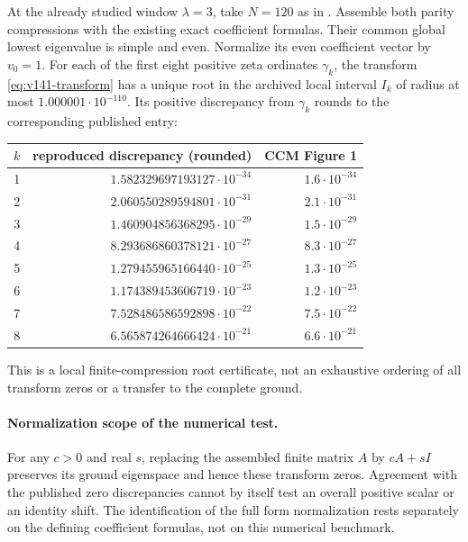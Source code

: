 \begin{proposition}
\label{prop:v141-ccm-lock}
At the already studied window $\lambda=3$, take $N=120$ as in
\cite[Section 6, Figure 1]{ConnesConsaniMoscovici2025}. Assemble
both parity compressions with the existing exact coefficient formulas.
Their common global lowest eigenvalue is simple and even. Normalize
its even coefficient vector by $v_0=1$. For each of the first eight
positive zeta ordinates $\gamma_k$, the transform
\eqref{eq:v141-transform} has a unique root in the archived local
interval $I_k$ of radius at most $1.000001\cdot10^{-110}$.
Its positive discrepancy from $\gamma_k$ rounds to the corresponding
published entry:
\begin{center}
\begin{tabular}{rrr}
\toprule
$k$ & reproduced discrepancy (rounded) & CCM Figure 1\\
\midrule
1 & $1.582329697193127\cdot10^{-34}$ & $1.6\cdot10^{-34}$\\
2 & $2.060550289594801\cdot10^{-31}$ & $2.1\cdot10^{-31}$\\
3 & $1.460904856368295\cdot10^{-29}$ & $1.5\cdot10^{-29}$\\
4 & $8.293686860378121\cdot10^{-27}$ & $8.3\cdot10^{-27}$\\
5 & $1.279455965166440\cdot10^{-25}$ & $1.3\cdot10^{-25}$\\
6 & $1.174389453606719\cdot10^{-23}$ & $1.2\cdot10^{-23}$\\
7 & $7.528486586592898\cdot10^{-22}$ & $7.5\cdot10^{-22}$\\
8 & $6.565874264666424\cdot10^{-21}$ & $6.6\cdot10^{-21}$\\
\bottomrule
\end{tabular}
\end{center}
This is a local finite-compression root certificate, not an exhaustive
ordering of all transform zeros or a transfer to the complete ground.

\paragraph{Normalization scope of the numerical test.}
For any $c>0$ and real $s$, replacing the assembled finite matrix
$A$ by $cA+sI$ preserves its ground eigenspace and hence these
transform zeros. Agreement with the published zero discrepancies
cannot by itself test an overall positive scalar or an identity shift.
The identification of the full form normalization rests separately on
the defining coefficient formulas, not on this numerical benchmark.
\end{proposition}
